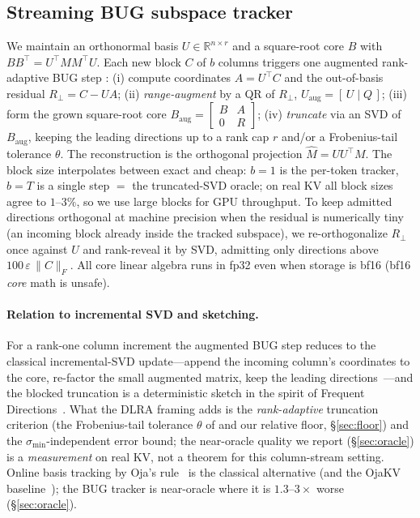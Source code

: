 \documentclass[11pt]{article}
\begin{document}
\subsection{Streaming BUG subspace tracker}
\label{sec:tracker}
We maintain an orthonormal basis $U \in \mathbb{R}^{n \times r}$ and a
square-root core $B$ with $B B^\top = U^\top M M^\top U$. Each new block $C$ of
$b$ columns triggers one augmented rank-adaptive BUG step
\citep{ceruti2022rankadaptive}: (i) compute coordinates $A = U^\top C$ and the
out-of-basis residual $R_\perp = C - U A$; (ii) \emph{range-augment} by a QR of
$R_\perp$, $U_{\text{aug}} = [\,U \mid Q\,]$; (iii) form the grown square-root
core $B_{\text{aug}} = \left[\begin{smallmatrix} B & A \\ 0 & R
\end{smallmatrix}\right]$; (iv) \emph{truncate} via an SVD of $B_{\text{aug}}$,
keeping the leading directions up to a rank cap $r$ and/or a Frobenius-tail
tolerance $\theta$. The reconstruction is the orthogonal projection $\hat M = U
U^\top M$. The block size interpolates between exact and cheap: $b{=}1$ is the
per-token tracker, $b{=}T$ is a single step $=$ the truncated-SVD oracle; on real
KV all block sizes agree to $1$--$3\%$, so we use large blocks for GPU
throughput. To keep admitted directions orthogonal at machine precision when the
residual is numerically tiny (an incoming block already inside the tracked
subspace), we re-orthogonalize $R_\perp$ once against $U$ and rank-reveal it by
SVD, admitting only directions above $100\,\varepsilon\,\|C\|_F$. All core linear
algebra runs in fp32 even when storage is bf16 (bf16 \emph{core} math is
unsafe).

\paragraph{Relation to incremental SVD and sketching.} For a rank-one column
increment the augmented BUG step reduces to the classical incremental-SVD
update---append the incoming column's coordinates to the core, re-factor the
small augmented matrix, keep the leading directions~\citep{brand2006fast}---and
the blocked truncation is a deterministic sketch in the spirit of Frequent
Directions~\citep{liberty2013simple}. What the DLRA framing adds is the
\emph{rank-adaptive} truncation criterion (the Frobenius-tail tolerance $\theta$
of \citet{ceruti2022rankadaptive} and our relative floor, \S\ref{sec:floor}) and
the $\sigma_{\min}$-independent error bound; the near-oracle quality we report
(\S\ref{sec:oracle}) is a \emph{measurement} on real KV, not a theorem for this
column-stream setting. Online basis tracking by Oja's
rule~\citep{oja1982simplified} is the classical alternative (and the OjaKV
baseline~\citep{zhu2025ojakv}); the BUG tracker is near-oracle where it is
$1.3$--$3\times$ worse (\S\ref{sec:oracle}).
\end{document}
